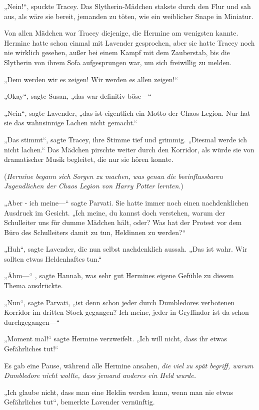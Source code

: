 {„Nein!“, spuckte Tracey. Das Slytherin-Mädchen stakste durch den Flur und sah aus, als wäre sie bereit, jemanden zu töten, wie ein weiblicher Snape in Miniatur.

Von allen Mädchen war Tracey diejenige, die Hermine am wenigsten kannte. Hermine hatte schon einmal mit Lavender gesprochen, aber sie hatte Tracey noch nie wirklich gesehen, außer bei einem Kampf mit dem Zauberstab, bis die Slytherin von ihrem Sofa aufgesprungen war, um sich freiwillig zu melden.

„Dem werden wir es zeigen! Wir werden es allen zeigen!“

„Okay“, sagte Susan, „das war definitiv böse—“

„Nein“, sagte Lavender, „das ist eigentlich ein Motto der Chaos Legion. Nur hat sie das wahnsinnige Lachen nicht gemacht.“

„Das stimmt“, sagte Tracey, ihre Stimme tief und grimmig. „Diesmal werde ich nicht lachen.“ Das Mädchen pirschte weiter durch den Korridor, als würde sie von dramatischer Musik begleitet, die nur sie hören konnte.

(\emph{Hermine begann sich Sorgen zu machen, was genau die beeinflussbaren Jugendlichen der Chaos Legion von Harry Potter lernten}.)

„Aber - ich meine—“ sagte Parvati. Sie hatte immer noch einen nachdenklichen Ausdruck im Gesicht. „Ich meine, du kannst doch verstehen, warum der Schulleiter uns für dumme Mädchen hält, oder? Was hat der Protest vor dem Büro des Schulleiters damit zu tun, Heldinnen zu werden?“

„Huh“, sagte Lavender, die nun selbst nachdenklich aussah. „Das ist wahr. Wir sollten etwas Heldenhaftes tun.“

„Ähm—“ , sagte Hannah, was sehr gut Hermines eigene Gefühle zu diesem Thema ausdrückte.

„Nun“, sagte Parvati, „ist denn schon jeder durch Dumbledores verbotenen Korridor im dritten Stock gegangen? Ich meine, jeder in Gryffindor ist da schon durchgegangen—“

„Moment mal!“ sagte Hermine verzweifelt. „Ich will nicht, dass ihr etwas Gefährliches tut!“

Es gab eine Pause, während alle Hermine ansahen, \emph{die viel zu spät begriff, warum Dumbledore nicht wollte, dass jemand anderes ein Held wurde.}

„Ich glaube nicht, dass man eine Heldin werden kann, wenn man nie etwas Gefährliches tut“, bemerkte Lavender vernünftig.

}
